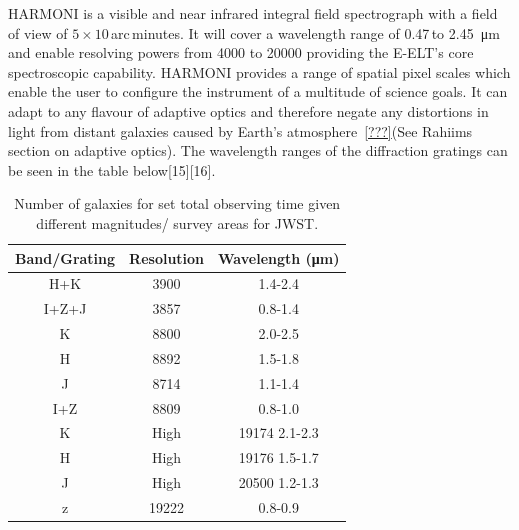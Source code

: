 			HARMONI is a visible and near infrared integral field spectrograph with a field of view of $5 \times 10$\,arc\,minutes. It will cover a wavelength range of 0.47\,to \SI{2.45}{\micro\metre} and enable resolving powers from \num{4000} to \num{20000} providing the E-ELT's core spectroscopic capability. HARMONI provides a range of spatial pixel scales which enable the user to configure the instrument of a multitude of science goals. It can adapt to any flavour of adaptive optics and therefore negate any distortions in light from distant galaxies caused by Earth’s atmosphere~\ref{???}(See Rahiims section on adaptive optics). The wavelength ranges of the diffraction gratings can be seen in the table below\cite{}[15]\cite{}[16].
			\begin{table}[!htbp]
				\begin{center}
					\begin{tabular}{c|c|c}
						Band/Grating & Resolution & Wavelength (\si{\micro\metre}) \\
						\hline \hline
						H+K 	& 3900 	& 1.4-2.4 \\
						I+Z+J 	& 3857 	& 0.8-1.4 \\
						K 		& 8800 	& 2.0-2.5 \\
						H 		& 8892 	& 1.5-1.8 \\
						J 		& 8714 	& 1.1-1.4 \\
						I+Z 	& 8809 	& 0.8-1.0 \\
						K 		& High 	& 19174 2.1-2.3 \\
						H 		& High 	& 19176 1.5-1.7 \\
						J 		& High 	& 20500 1.2-1.3 \\
						z 		& 19222 & 0.8-0.9
					\end{tabular}
				\end{center}
				\caption{Number of galaxies for set total observing time given different magnitudes/ survey areas for JWST.\label{tab:galaxies_for_set_total_observing_time_JWST}}
			\end{table}

